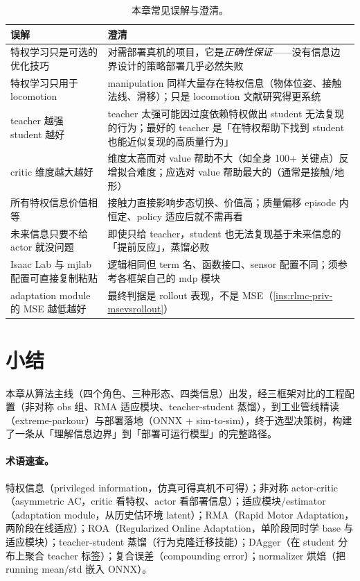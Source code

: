\begin{table}[H]
\centering
\small
\caption{本章常见误解与澄清。}
\label{tab:rlmc-priv-misconc}
\begin{tabular}{@{}p{5.6cm}p{7.2cm}@{}}
\toprule
误解 & 澄清 \\
\midrule
特权学习只是可选的优化技巧 & 对需部署真机的项目，它是\emph{正确性保证}——没有信息边界设计的策略部署几乎必然失败 \\
特权学习只用于 locomotion & manipulation 同样大量存在特权信息（物体位姿、接触法线、滑移）；只是 locomotion 文献研究得更系统 \\
teacher 越强 student 越好 & teacher 太强可能因过度依赖特权做出 student 无法复现的行为；最好的 teacher 是「在特权帮助下找到 student 也能近似复现的高质量行为」 \\
critic 维度越大越好 & 维度太高而对 value 帮助不大（如全身 100+ 关键点）反增拟合难度；应选对 value 帮助最大的（通常是接触/地形） \\
所有特权信息价值相等 & 接触力直接影响步态切换、价值高；质量偏移 episode 内恒定、policy 适应后就不需再看 \\
未来信息只要不给 actor 就没问题 & 即使只给 teacher，student 也无法复现基于未来信息的「提前反应」，蒸馏必败 \\
Isaac Lab 与 mjlab 配置可直接复制粘贴 & 逻辑相同但 term 名、函数接口、sensor 配置不同；须参考各框架自己的 mdp 模块 \\
adaptation module 的 MSE 越低越好 & 最终判据是 rollout 表现，不是 MSE（\cref{ins:rlmc-priv-msevsrollout}） \\
\bottomrule
\end{tabular}
\end{table}

\section*{小结}
\label{sec:rlmc-priv-summary}

本章从算法主线（四个角色、三种形态、四类信息）出发，经三框架对比的工程配置（非对称 obs 组、RMA 适应模块、teacher-student 蒸馏），到工业管线精读（extreme-parkour）与部署落地（ONNX + sim-to-sim），终于选型决策树，构建了一条从「理解信息边界」到「部署可运行模型」的完整路径。

\paragraph{术语速查。} 特权信息（privileged information，仿真可得真机不可得）；非对称 actor-critic（asymmetric AC，critic 看特权、actor 看部署信息）；适应模块/estimator（adaptation module，从历史估环境 latent）；RMA（Rapid Motor Adaptation，两阶段在线适应）；ROA（Regularized Online Adaptation，单阶段同时学 base 与适应模块）；teacher-student 蒸馏（行为克隆迁移技能）；DAgger（在 student 分布上聚合 teacher 标签）；复合误差（compounding error）；normalizer 烘焙（把 running mean/std 嵌入 ONNX）。


